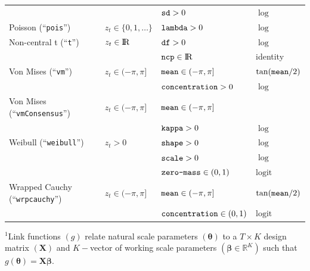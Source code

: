 \documentclass[12pt]{article}\usepackage[]{graphicx}\usepackage[]{xcolor}
\begin{document}
\begin{small}
\begin{table}
\begin{tabular}{llll}
                                              &                               & $\verb|sd|>0$                                   &  $\log$ \tabularnewline       
  \rowcolor{Gray} Poisson (``\verb|pois|'')   & $z_t\in\{0,1,\ldots\}$        & $\verb|lambda|>0$                               &  $\log$ \tabularnewline  
  Non-central t (``\verb|t|'')                & $z_t\in{\rm I\!R}$            & $\verb|df|>0$                                   &  $\log$ \tabularnewline  
                                              &                               & $\verb|ncp|\in{\rm I\!R}$                       &  identity \tabularnewline 
  \rowcolor{Gray} Von Mises (``\verb|vm|'')   & $z_t\in(-\pi,\pi]$            & $\verb|mean|\in(-\pi,\pi]$                      &  $\tan(\verb|mean|/2)$ \tabularnewline  
  \rowcolor{Gray}                             &                               & $\verb|concentration|>0$                        &  $\log$ \tabularnewline 
  Von Mises (``\verb|vmConsensus|'')          & $z_t\in(-\pi,\pi]$            & $\verb|mean|\in(-\pi,\pi]$                      &  \citeauthor{RivestEtAl2016} \tabularnewline  
                                              &                               & $\verb|kappa|>0$                                &  $\log$ \tabularnewline 
  \rowcolor{Gray} Weibull (``\verb|weibull|'')& $z_t>0$                       & $\verb|shape|>0$                                &  $\log$ \tabularnewline  
  \rowcolor{Gray}                             &                               & $\verb|scale|>0$                                &  $\log$ \tabularnewline  
  \rowcolor{Gray}                             &                               & $\verb|zero-mass|\in(0,1)$                      &  $\text{logit}$ \tabularnewline 
  Wrapped Cauchy (``\verb|wrpcauchy|'')       & $z_t\in(-\pi,\pi]$            & $\verb|mean|\in(-\pi,\pi]$                      &  $\tan(\verb|mean|/2)$ \tabularnewline  
                                              &                               & $\verb|concentration|\in(0,1)$                  &  $\text{logit}$ \tabularnewline 
  \bottomrule
  \end{tabular}
  \footnotesize{$^1$Link functions $(g)$ relate natural scale parameters $({\boldsymbol \theta})$ to a $T \times K$ design matrix $({\mathbf X})$ and $K-$vector of working scale parameters $(\boldsymbol{\beta}\in \mathbb{R}^K)$ such that $g({\boldsymbol \theta})={\mathbf X}\boldsymbol{\beta}$. %
}
\end{table}
\end{small}
\end{document}

